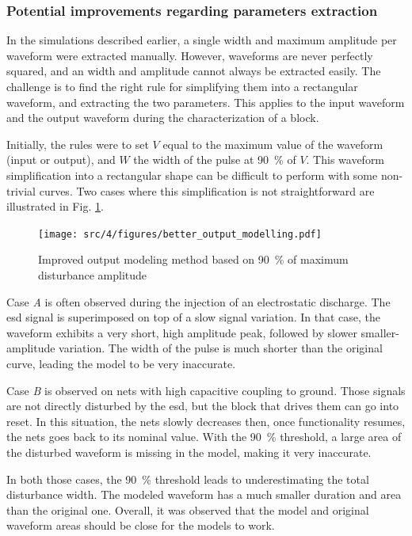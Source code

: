 \subsubsection{Potential improvements regarding parameters extraction}

In the simulations described earlier, a single width and maximum amplitude per waveform were extracted manually.
However, waveforms are never perfectly squared, and an width and amplitude cannot always be extracted easily.
The challenge is to find the right rule for simplifying them into a rectangular waveform, and extracting the two parameters.
This applies to the input waveform and the output waveform during the characterization of a block.

Initially, the rules were to set $V$ equal to the maximum value of the waveform (input or output), and $W$ the width of the pulse at \SI{90}{\percent} of $V$.
This waveform simplification into a rectangular shape can be difficult to perform with some non-trivial curves.
Two cases where this simplification is not straightforward are illustrated in Fig. \ref{fig:improved-output-modeling}.

\begin{figure}[!h]
  \centering
  \texttt{[image: src/4/figures/better\_output\_modelling.pdf]}
  \caption{Improved output modeling method based on \SI{90}{\percent} of maximum disturbance amplitude}
  \label{fig:improved-output-modeling}
\end{figure}

Case \textit{A} is often observed during the injection of an electrostatic discharge.
The \gls{esd} signal is superimposed on top of a slow signal variation.
In that case, the waveform exhibits a very short, high amplitude peak, followed by slower smaller-amplitude variation.
The width of the pulse is much shorter than the original curve, leading the model to be very inaccurate.

Case \textit{B} is observed on nets with high capacitive coupling to ground.
Those signals are not directly disturbed by the \gls{esd}, but the block that drives them can go into reset.
In this situation, the nets slowly decreases then, once functionality resumes, the nets goes back to its nominal value.
With the \SI{90}{\percent} threshold, a large area of the disturbed waveform is missing in the model, making it very inaccurate.

In both those cases, the \SI{90}{\percent} threshold leads to underestimating the total disturbance width.
The modeled waveform has a much smaller duration and area than the original one.
Overall, it was observed that the model and original waveform areas should be close for the models to work.

